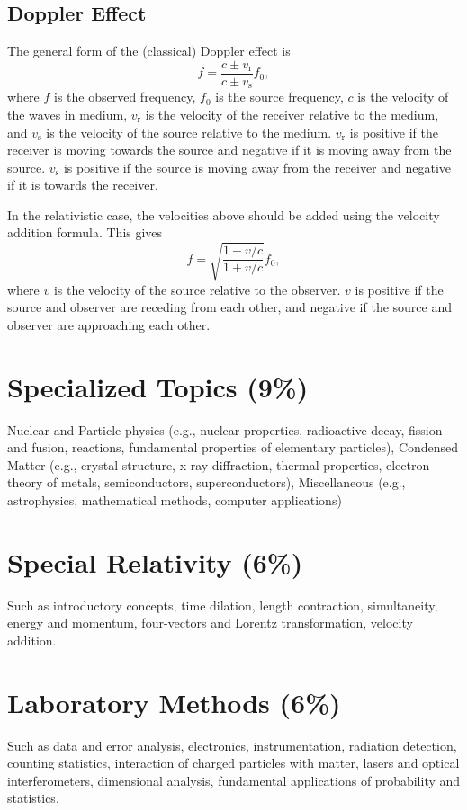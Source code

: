 \documentclass[%
 reprint,
superscriptaddress,
 amsmath,amssymb,
 aps,
prc,
]{revtex4-1}
\begin{document}
\subsection{Doppler Effect}
The general form of the (classical) Doppler effect is
\begin{equation}
	f=\frac{c \pm v_\text{r}}{c \pm v_\text{s}} f_0,
\end{equation}
where $f$ is the observed frequency, $f_0$ is the source frequency, $c$ is the velocity of the waves in medium, $v_\text{r}$ is the velocity of the receiver relative to the medium, and $v_\text{s}$ is the velocity of the source relative to the medium. $v_\text{r}$ is positive if the receiver is moving towards the source and negative if it is moving away from the source. $v_\text{s}$ is positive if the source is moving away from the receiver and negative if it is towards the receiver.

In the relativistic case, the velocities above should be added using the velocity addition formula. This gives 
\begin{equation}
	f = \sqrt{\frac{1 - v/c}{1 + v/c}} f_0,
\end{equation}
where $v$ is the velocity of the source relative to the observer. $v$ is positive if the source and observer are receding from each other, and negative if the source and observer are approaching each other.

\section{Specialized Topics (9\%)}
Nuclear and Particle physics (e.g., nuclear properties, radioactive decay, fission and fusion, reactions, fundamental properties of elementary particles), Condensed Matter (e.g., crystal structure, x-ray diffraction, thermal properties, electron theory of metals, semiconductors, superconductors), Miscellaneous (e.g., astrophysics, mathematical methods, computer applications)

\section{Special Relativity (6\%)}
Such as introductory concepts, time dilation, length contraction, simultaneity, energy and momentum, four-vectors and Lorentz transformation, velocity addition.

\section{Laboratory Methods (6\%)}
Such as data and error analysis, electronics, instrumentation, radiation detection, counting statistics, interaction of charged particles with matter, lasers and optical interferometers, dimensional analysis, fundamental applications of probability and statistics.
\end{document}
